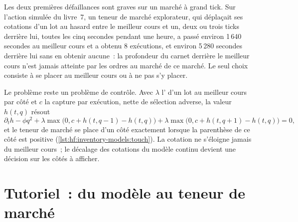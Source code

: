 Les deux premières défaillances sont graves sur un marché à grand tick. Sur l'action simulée du livre~7, un teneur de marché explorateur, qui déplaçait ses cotations d'un lot au hasard
entre le meilleur cours et un, deux ou trois ticks derrière lui, toutes les cinq secondes pendant une heure, a passé environ 1\,640 secondes au meilleur cours et a obtenu 8 exécutions, et
environ 5\,280 secondes derrière lui sans en obtenir aucune~: la profondeur du carnet derrière le meilleur cours n'est jamais atteinte par les ordres au marché de ce marché. Le seul
choix consiste à se placer au meilleur cours ou à ne pas s'y placer.

Le problème reste un problème de contrôle. Avec $\lambda$ l' d'un lot au meilleur cours par côté et $c$ la capture par exécution, nette de
sélection adverse, la valeur $h(t,q)$ résout
\[
\partial_th-\phi q^2+\lambda\max\bigl(0,c+h(t,q-1)-h(t,q)\bigr)+\lambda\max\bigl(0,c+h(t,q+1)-h(t,q)\bigr)=0,
\]
et le teneur de marché se place d'un côté exactement lorsque la parenthèse de ce côté est positive (\cref{lst:hf:inventory-models:touch}). La cotation ne s'éloigne jamais du meilleur cours~;
le décalage des cotations du modèle continu devient une décision sur les côtés à afficher.

\section{Tutoriel~: du modèle au teneur de marché}\label{tut:hf:inventory-models:tut}

